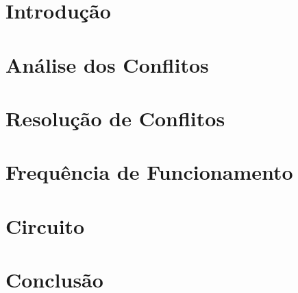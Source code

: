 \documentclass[12pt,a4paper]{scrartcl}
\begin{document}


\tableofcontents
{}

\pagebreak

\setcounter{page}{1}

\section{Introdução}


\section{Análise dos Conflitos}


\section{Resolução de Conflitos}


\section{Frequência de Funcionamento}


\section{Circuito}


\section{Conclusão}


\listoftables

\listoffigures
 
\pagebreak


\end{document}
